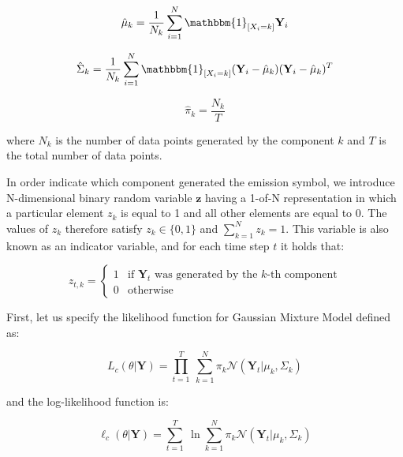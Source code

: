\begin{equation}
    \hat{\mu}_k = \frac{1}{N_k} \sum_{i=1}^{N} \mathbbm{1}_{[X_i = k]} \textbf{Y}_i
\end{equation}

\begin{equation}
    \hat{\Sigma}_k = \frac{1}{N_k} \sum_{i=1}^{N} \mathbbm{1}_{[X_i = k]} (\textbf{Y}_i - \hat{\mu}_k)(\textbf{Y}_i - \hat{\mu}_k)^T
\end{equation}

\begin{equation}
    \hat{\pi}_k = \frac{N_k}{T}
\end{equation}
    
\noindent where $N_k$ is the number of data points generated by the component $k$ and $T$ is the total number of data points. 

In order indicate which component generated the emission symbol, we introduce N-dimensional binary random variable $\textbf{z}$ having a 1-of-N representation 
in which a particular element $z_k$ is equal to 1 and all other elements are equal to 0. The values of $z_k$ therefore satisfy $z_k \in \{0, 1\}$ and 
$\sum_{k=1}^{N} z_k = 1$. \citep{Bishop2006} This variable is also known as an indicator variable, and for each time step $t$ it holds that:

\begin{equation}
    z_{t,k} = \begin{cases}
        1 & \text{if } \textbf{Y}_t \text{ was generated by the } k\text{-th component} \\
        0 & \text{otherwise}
    \end{cases}
\end{equation}

First, let us specify the likelihood function for Gaussian Mixture Model defined as: 

\begin{equation} \label{eq:likelihood-gaussian}
    L_c(\theta|\textbf{Y}) = \prod_{t=1}^{T}\: \sum_{k=1}^{N} \pi_k \mathcal{N}(\textbf{Y}_t|\mu_k,\Sigma_k)
\end{equation}

\noindent and the log-likelihood function is:

\begin{equation} \label{eq:loglikelihood-gaussian}
    \ell_c(\theta|\textbf{Y}) = \sum_{t=1}^{T}\: \ln \sum_{k=1}^{N} \pi_k \mathcal{N}(\textbf{Y}_t|\mu_k,\Sigma_k)
\end{equation}

